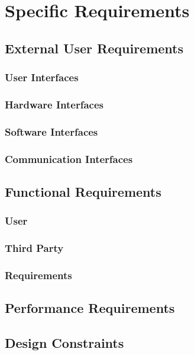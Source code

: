 \documentclass[12pt]{report}
\begin{document}
\newpage
\chapter{Specific Requirements}
    \section{External User Requirements}
        \subsection{User Interfaces}
        	
        \subsection{Hardware Interfaces}
        	
        \subsection{Software Interfaces}
        	
        \subsection{Communication Interfaces}
    \section{Functional Requirements}
        \subsection{User}
            
        \subsection{Third Party}
            
        \subsection{Requirements}
        	
    \section{Performance Requirements}
    	
    \section{Design Constraints}
\end{document}
